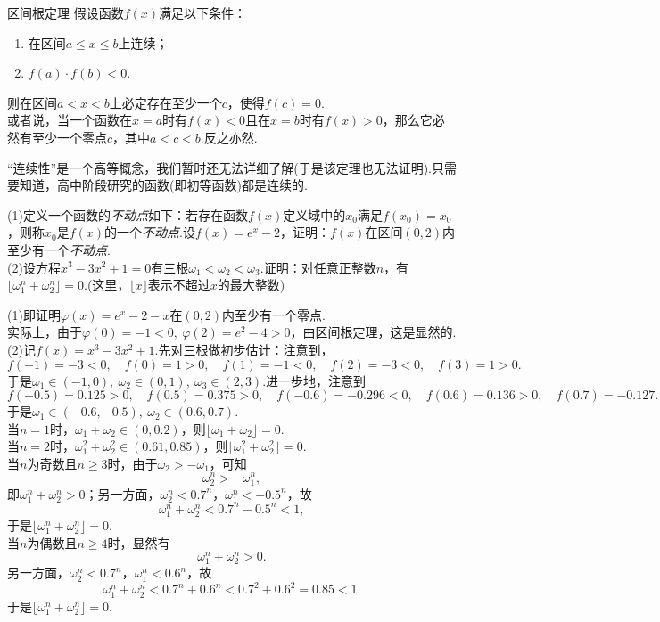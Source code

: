 \documentclass[lang=cn, zihao=5]{elegantbook}
\newcommand{\lrfloor}[1]{\lfloor #1 \rfloor}
\begin{document}
\begin{theorem}{区间根定理}
    假设函数$f(x)$满足以下条件：
    \begin{enumerate}
        \item 在区间$a \leq x \leq b$上连续；
        \item $f(a) \cdot f(b)<0$.
    \end{enumerate}
    则在区间$a<x<b$上必定存在至少一个$c$，使得$f(c)=0$.\\
    或者说，当一个函数在$x=a$时有$f(x)<0$且在$x=b$时有$f(x)>0$，那么它必然有至少一个零点$c$，其中$a<c<b$.反之亦然.
\end{theorem}
\begin{remark}
	“连续性”是一个高等概念，我们暂时还无法详细了解(于是该定理也无法证明).只需要知道，高中阶段研究的函数(即初等函数)都是连续的.
\end{remark}

\begin{example}
	(1)定义一个函数的\textit{不动点}如下：若存在函数$f(x)$定义域中的$x_0$满足$f(x_0)=x_0$，则称$x_0$是$f(x)$的一个\textit{不动点}.设$f(x)=e^x-2$，证明：$f(x)$在区间$(0,2)$内至少有一个\textit{不动点}. \\
	(2)设方程$x^3-3x^2+1=0$有三根$\omega _1 < \omega _2 < \omega _3$.证明：对任意正整数$n$，有$\lfloor \omega _1 ^n + \omega _2 ^n \rfloor = 0$.(这里，$\lfloor x \rfloor$表示不超过$x$的最大整数)
\end{example}
\begin{solution}
	(1)即证明$\varphi (x) = e^x-2-x$在$(0,2)$内至少有一个零点. \\
	实际上，由于$\varphi (0) = -1 < 0,~\varphi (2)=e^2-4 > 0$，由区间根定理，这是显然的. \\
	(2)记$f(x)=x^3-3x^2+1$.先对三根做初步估计：注意到，$$f(-1)=-3<0,\quad f(0)=1>0,\quad f(1)=-1<0,\quad f(2)=-3<0,\quad f(3)=1>0.$$
	于是$\omega _1 \in (-1,0),~\omega _2 \in (0,1),~\omega _3 \in (2,3)$.进一步地，注意到$$f(-0.5)=0.125>0,\quad f(0.5)=0.375>0,\quad f(-0.6)=-0.296<0,\quad f(0.6)=0.136>0,\quad f(0.7)=-0.127.$$
	于是$\omega _1 \in (-0.6,-0.5),~\omega _2 \in (0.6,0.7)$. \\
	当$n=1$时，$\omega _1 + \omega _2 \in (0,0.2)$，则$\lrfloor{\omega _1 + \omega _2}=0$. \\
	当$n=2$时，$\omega _1^2 + \omega _2^2 \in (0.61,0.85)$，则$\lrfloor{\omega _1^2 + \omega _2^2} =0$. \\
	当$n$为奇数且$n \geq 3$时，由于$\omega _2 > -\omega _1$，可知$$\omega _2^n > -\omega _1^n,$$
	即$\omega _1 ^n + \omega _2 ^n >0$；另一方面，$\omega _2^n < 0.7^n$，$\omega _1 ^n < -0.5^n$，故$$\omega _1 ^n + \omega _2 ^n < 0.7^n - 0.5^n <1,$$
	于是$\lrfloor{\omega _1 ^n + \omega _2 ^n} = 0$. \\
	当$n$为偶数且$n \geq 4$时，显然有$$\omega _1 ^n + \omega _2 ^n >0.$$
	另一方面，$\omega _2^n < 0.7^n$，$\omega _1 ^n < 0.6^n$，故$$\omega _1 ^n + \omega _2 ^n < 0.7^n + 0.6^n < 0.7^2 + 0.6^2 = 0.85 < 1.$$
	于是$\lrfloor{\omega _1 ^n + \omega _2 ^n} = 0$.
\end{solution}
\end{document}

